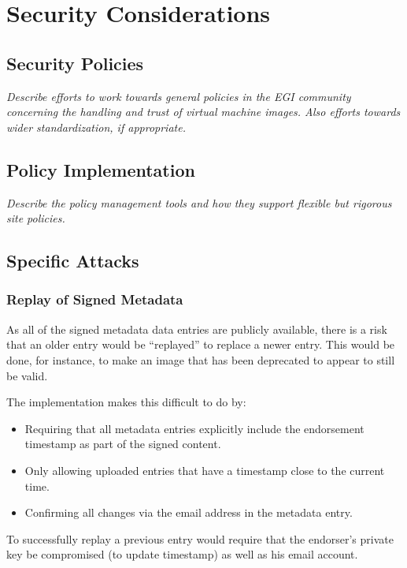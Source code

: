 \section{Security Considerations}
\label{sec:security}

\subsection{Security Policies}

{\em Describe efforts to work towards general policies in the EGI
  community concerning the handling and trust of virtual machine
  images.  Also efforts towards wider standardization, if
  appropriate.}

\subsection{Policy Implementation}

{\em Describe the policy management tools and how they support
  flexible but rigorous site policies.}

\subsection{Specific Attacks}

\subsubsection{Replay of Signed Metadata}

As all of the signed metadata data entries are publicly available,
there is a risk that an older entry would be ``replayed'' to replace a
newer entry.  This would be done, for instance, to make an image that
has been deprecated to appear to still be valid.

The implementation makes this difficult to do by:
\begin{itemize}
\item Requiring that all metadata entries explicitly include the
  endorsement timestamp as part of the signed content.
\item Only allowing uploaded entries that have a timestamp close to
  the current time.
\item Confirming all changes via the email address in the metadata
  entry.
\end{itemize}
To successfully replay a previous entry would require that the
endorser's private key be compromised (to update timestamp) as well as
his email account.


